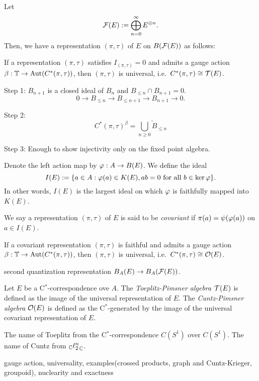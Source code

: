 \documentclass{../../../small}
\begin{document}
\begin{defn}
Let
\[\mathcal{F}(E):=\bigoplus_{n=0}^\infty E^{\otimes n}.\]
Then, we have a representation $(\pi,\tau)$ of $E$ on $B(\mathcal{F}(E))$ as follows:
\end{defn}


\begin{thm}
If a representation $(\pi,\tau)$ satisfies $I_{(\pi,\tau)}=0$ and admits a gauge action $\beta:\mathbb{T}\to\operatorname{Aut}(C^*(\pi,\tau))$, then $(\pi,\tau)$ is universal, i.e.~$C^*(\pi,\tau)\cong\mathcal{T}(E)$.
\end{thm}
\begin{pf}[Sketch]
Step 1: $B_{n+1}$ is a closed ideal of $B_n$ and $B_{\le n}\cap B_{n+1}=0$.
\[0\to B_{\le n}\to B_{\le n+1}\to B_{n+1}\to0.\]

Step 2:
\[C^*(\pi,\tau)^\beta=\bar{\bigcup_{n\ge0} B_{\le n}}\]

Step 3: Enough to show injectivity only on the fixed point algebra.
\end{pf}






\bigskip

Denote the left action map by $\varphi:A\to B(E)$.
We define the ideal
\[I(E):=\{a\in A:\varphi(a)\in K(E), ab=0\text{ for all }b\in\ker\varphi\}.\]
In other words, $I(E)$ is the largest ideal on which $\varphi$ is faithfully mapped into $K(E)$.

\begin{defn}
We say a representation $(\pi,\tau)$ of $E$ is said to be \emph{covariant} if $\pi(a)=\psi(\varphi(a))$ on $a\in I(E)$.
\end{defn}
\begin{thm}
If a covariant representation $(\pi,\tau)$ is faithful and admits a gauge action $\beta:\mathbb{T}\to\operatorname{Aut}(C^*(\pi,\tau))$, then $(\pi,\tau)$ is universal, i.e.~$C^*(\pi,\tau)\cong\mathcal{O}(E)$.
\end{thm}

second quantization representation $B_ A(E)\to B_ A(\mathcal{F}(E))$.

\begin{defn}
Let $E$ be a C$^*$-correspondence ove $A$.
The \emph{Toeplitz-Pimsner algebra} $\mathcal{T}(E)$ is defined as the image of the universal representation of $E$.
The \emph{Cuntz-Pimsner algebra} $\mathcal{O}(E)$ is defined as the C$^*$-generated by the image of the universal covariant representation of $E$.
\end{defn}

The name of Toeplitz from the C$^*$-correspondence $C(S^1)$ over $C(S^1)$.
The name of Cuntz from $_{\mathbb{C}}{\ell_2^n}_{\mathbb{C}}$.



gauge action,
universality,
examples(crossed products, graph and Cuntz-Krieger, groupoid),
nuclearity and exactness
\end{document}
